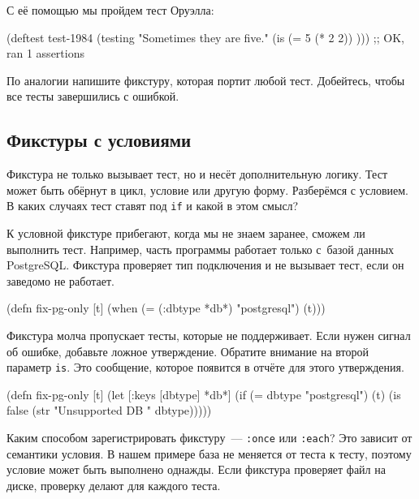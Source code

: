 
\noindent
С её помощью мы пройдем тест Оруэлла:

\begin{english}
  \begin{clojure}
(deftest test-1984
  (testing "Sometimes they are five."
    (is (= 5 (* 2 2)) )))
;; OK, ran 1 assertions
  \end{clojure}
\end{english}

По аналогии напишите фикстуру, которая портит любой тест. Добейтесь, чтобы все
тесты завершились с ошибкой.

\subsection{Фикстуры с условиями}


Фикстура не только вызывает тест, но и несёт дополнительную логику. Тест может
быть обёрнут в цикл, условие или другую форму. Разберёмся с условием. В
каких случаях тест ставят под \verb|if| и какой в этом смысл?

К условной фикстуре прибегают, когда мы не знаем заранее, сможем ли выполнить
тест. Например, часть программы работает только с~базой данных
PostgreSQL. Фикстура проверяет тип подключения и не вызывает тест, если он
заведомо не работает.

\begin{english}
  \begin{clojure}
(defn fix-pg-only [t]
  (when (= (:dbtype *db*) "postgresql")
    (t)))
  \end{clojure}
\end{english}

Фикстура молча пропускает тесты, которые не поддерживает. Если нужен сигнал об
ошибке, добавьте ложное утверждение. Обратите внимание на второй параметр
\verb|is|. Это сообщение, которое появится в отчёте для этого утверждения.

\begin{english}
  \begin{clojure}
(defn fix-pg-only [t]
  (let [{:keys [dbtype]} *db*]
    (if (= dbtype "postgresql")
      (t)
      (is false (str "Unsupported DB " dbtype)))))
  \end{clojure}
\end{english}

Каким способом зарегистрировать фикстуру~--- \verb|:once| или \verb|:each|?
Это зависит от семантики условия. В нашем примере база не меняется от теста к
тесту, поэтому условие может быть выполнено однажды. Если фикстура проверяет
файл на диске, проверку делают для каждого теста.

